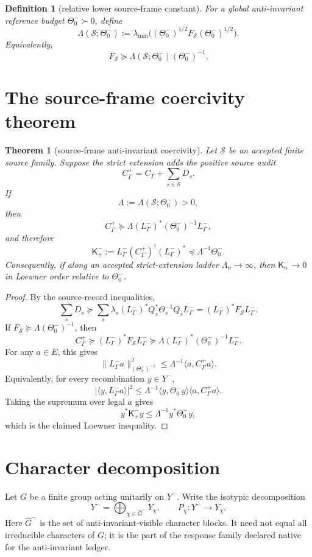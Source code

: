 \documentclass[11pt]{article}
\newtheorem{theorem}{Theorem}
\newtheorem{definition}{Definition}
\begin{document}
\begin{definition}[relative lower source-frame constant]
For a global anti-invariant reference budget \(\Theta^-_0\succ0\), define
\[
  \Lambda(\mathcal S;\Theta^-_0)
  :=
  \lambda_{\min}\!\bigl((\Theta^-_0)^{1/2}F_{\mathcal S}(\Theta^-_0)^{1/2}\bigr).
\]
Equivalently,
\[
  F_{\mathcal S}\succeq \Lambda(\mathcal S;\Theta^-_0)(\Theta^-_0)^{-1}.
\]
\end{definition}

\section{The source-frame coercivity theorem}
\begin{theorem}[source-frame anti-invariant coercivity]
Let \(\mathcal S\) be an accepted finite source family.  Suppose the strict extension adds the positive source audit
\[
  C_\Gamma^+ = C_\Gamma + \sum_{s\in\mathcal S}D_s .
\]
If
\[
  \Lambda:=\Lambda(\mathcal S;\Theta^-_0)>0,
\]
then
\[
  C_\Gamma^+\succeq
  \Lambda (L^-_\Gamma)^*(\Theta^-_0)^{-1}L^-_\Gamma,
\]
and therefore
\[
\boxed{
  \mathsf K^-_+ := L^-_\Gamma (C_\Gamma^+)^\dagger (L^-_\Gamma)^*
  \preceq \Lambda^{-1}\Theta^-_0.
}
\]
Consequently, if along an accepted strict-extension ladder \(\Lambda_n\to\infty\), then \(\mathsf K^-_n\to0\) in Loewner order relative to \(\Theta^-_0\).
\end{theorem}

\begin{proof}
By the source-record inequalities,
\[
  \sum_sD_s\succeq
  \sum_s \lambda_s(L^-_\Gamma)^*Q_s^*\Theta_s^{-1}Q_sL^-_\Gamma
  = (L^-_\Gamma)^*F_{\mathcal S}L^-_\Gamma.
\]
If \(F_{\mathcal S}\succeq \Lambda(\Theta^-_0)^{-1}\), then
\[
  C_\Gamma^+\succeq
  (L^-_\Gamma)^*F_{\mathcal S}L^-_\Gamma
  \succeq
  \Lambda (L^-_\Gamma)^*(\Theta^-_0)^{-1}L^-_\Gamma.
\]
For any \(a\in E\), this gives
\[
  \|L^-_\Gamma a\|^2_{(\Theta^-_0)^{-1}}
  \le \Lambda^{-1}\langle a,C_\Gamma^+a\rangle.
\]
Equivalently, for every recombination \(y\in Y^-\),
\[
  |\langle y,L^-_\Gamma a\rangle|^2
  \le
  \Lambda^{-1}\langle y,\Theta^-_0 y\rangle\langle a,C_\Gamma^+a\rangle.
\]
Taking the supremum over legal \(a\) gives
\[
  y^*\mathsf K^-_+y\le \Lambda^{-1}y^*\Theta^-_0y,
\]
which is the claimed Loewner inequality.
\end{proof}

\section{Character decomposition}
Let \(G\) be a finite group acting unitarily on \(Y^-\).  Write the isotypic decomposition
\[
  Y^- = \bigoplus_{\chi\in\widehat G^-}Y_\chi,
  \qquad
  P_\chi:Y^-\to Y_\chi.
\]
Here \(\widehat G^-\) is the set of anti-invariant-visible character blocks.  It need not equal all irreducible characters of \(G\); it is the part of the response family declared native for the anti-invariant ledger.
\end{document}
